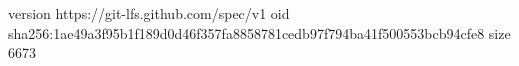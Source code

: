 version https://git-lfs.github.com/spec/v1
oid sha256:1ae49a3f95b1f189d0d46f357fa8858781cedb97f794ba41f500553bcb94cfe8
size 6673
